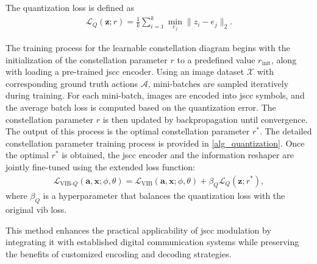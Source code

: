 The quantization loss is defined as
\begin{align}
    \mathcal{L}_{Q}(\bm{z};r)=\frac{1}{k}\sum_{i=1}^{k}\mathop{\min}_{e_j}\|z_i-e_j \|_2.
\end{align}

The training process for the learnable constellation diagram begins with the initialization of the constellation parameter \(r\) to a predefined value \(r_{\text{init}}\), along with loading a pre-trained \gls{jscc} encoder. Using an image dataset \(\mathcal{X}\) with corresponding ground truth actions \(\mathcal{A}\), mini-batches are sampled iteratively during training. For each mini-batch, images are encoded into \gls{jscc} symbols, and the average batch loss is computed based on the quantization error. The constellation parameter \(r\) is then updated by backpropagation until convergence. The output of this process is the optimal constellation parameter \(r^*\). The detailed constellation parameter training process is provided in \cref{alg_quantization}. Once the optimal $r^*$ is obtained, the \gls{jscc} encoder and the information reshaper are jointly fine-tuned using the extended loss function:
\begin{align}
    \mathcal{L}_{\text{VIB-}Q}(\bm{a}, \bm{x};\phi,\theta)=\mathcal{L}_{\text{VIB}}(\bm{a}, \bm{x};\phi,\theta) + \beta_{Q}\mathcal{L}_{Q}(\bm{z};r^*),
    \label{eq_loss_VIBQ}
\end{align}
where $\beta_{Q}$ is a hyperparameter that balances the quantization loss with the original \gls{vib} loss.

This method enhances the practical applicability of \gls{jscc} modulation by integrating it with established digital communication systems while preserving the benefits of customized encoding and decoding strategies.








 